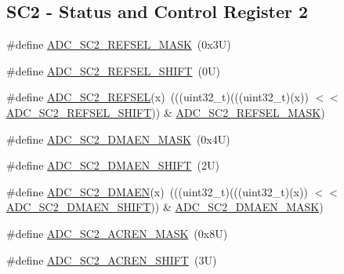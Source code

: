 \subsection*{S\+C2 -\/ Status and Control Register 2}
\begin{DoxyCompactItemize}
\item 
\#define \mbox{\hyperlink{group___a_d_c___register___masks_gaa821d1e2e4575c757e9446da61b2230a}{A\+D\+C\+\_\+\+S\+C2\+\_\+\+R\+E\+F\+S\+E\+L\+\_\+\+M\+A\+SK}}~(0x3\+U)
\item 
\#define \mbox{\hyperlink{group___a_d_c___register___masks_gaab9b293eb54de2d9d246766002e44556}{A\+D\+C\+\_\+\+S\+C2\+\_\+\+R\+E\+F\+S\+E\+L\+\_\+\+S\+H\+I\+FT}}~(0\+U)
\item 
\#define \mbox{\hyperlink{group___a_d_c___register___masks_gacac3b41d5c2bb74a8c614f200f0c0a36}{A\+D\+C\+\_\+\+S\+C2\+\_\+\+R\+E\+F\+S\+EL}}(x)~(((uint32\+\_\+t)(((uint32\+\_\+t)(x)) $<$$<$ \mbox{\hyperlink{group___a_d_c___register___masks_gaab9b293eb54de2d9d246766002e44556}{A\+D\+C\+\_\+\+S\+C2\+\_\+\+R\+E\+F\+S\+E\+L\+\_\+\+S\+H\+I\+FT}})) \& \mbox{\hyperlink{group___a_d_c___register___masks_gaa821d1e2e4575c757e9446da61b2230a}{A\+D\+C\+\_\+\+S\+C2\+\_\+\+R\+E\+F\+S\+E\+L\+\_\+\+M\+A\+SK}})
\item 
\#define \mbox{\hyperlink{group___a_d_c___register___masks_ga50fc5fed4844c3ceb8da9b595029da11}{A\+D\+C\+\_\+\+S\+C2\+\_\+\+D\+M\+A\+E\+N\+\_\+\+M\+A\+SK}}~(0x4\+U)
\item 
\#define \mbox{\hyperlink{group___a_d_c___register___masks_ga5554f538c0c6d7b3e2dfa502fdfed488}{A\+D\+C\+\_\+\+S\+C2\+\_\+\+D\+M\+A\+E\+N\+\_\+\+S\+H\+I\+FT}}~(2\+U)
\item 
\#define \mbox{\hyperlink{group___a_d_c___register___masks_ga8917f7dbaa5ca1d78f2fddb82a9e004d}{A\+D\+C\+\_\+\+S\+C2\+\_\+\+D\+M\+A\+EN}}(x)~(((uint32\+\_\+t)(((uint32\+\_\+t)(x)) $<$$<$ \mbox{\hyperlink{group___a_d_c___register___masks_ga5554f538c0c6d7b3e2dfa502fdfed488}{A\+D\+C\+\_\+\+S\+C2\+\_\+\+D\+M\+A\+E\+N\+\_\+\+S\+H\+I\+FT}})) \& \mbox{\hyperlink{group___a_d_c___register___masks_ga50fc5fed4844c3ceb8da9b595029da11}{A\+D\+C\+\_\+\+S\+C2\+\_\+\+D\+M\+A\+E\+N\+\_\+\+M\+A\+SK}})
\item 
\#define \mbox{\hyperlink{group___a_d_c___register___masks_ga25f7f0c6a6513cbfbd4684513b373f9c}{A\+D\+C\+\_\+\+S\+C2\+\_\+\+A\+C\+R\+E\+N\+\_\+\+M\+A\+SK}}~(0x8\+U)
\item 
\#define \mbox{\hyperlink{group___a_d_c___register___masks_ga34954b7e5cb86e290b281e2f97b63187}{A\+D\+C\+\_\+\+S\+C2\+\_\+\+A\+C\+R\+E\+N\+\_\+\+S\+H\+I\+FT}}~(3\+U)

\end{DoxyCompactItemize}
